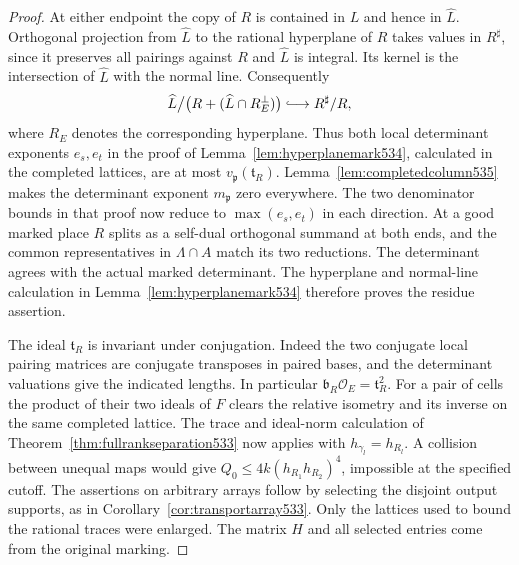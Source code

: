 \documentclass[a4paper,11pt]{article}
\theoremstyle{definition}
\theoremstyle{remark}
\numberwithin{equation}{section}
\begin{document}
\begin{proof}
At either endpoint the copy of \(R\) is contained in \(L\)
and hence in \(\widehat L\). Orthogonal projection from
\(\widehat L\) to the rational hyperplane of \(R\) takes
values in \(R^\sharp\), since it preserves all pairings against
\(R\) and \(\widehat L\) is integral. Its kernel is the
intersection of \(\widehat L\) with the normal line. Consequently
\[
    \widehat L\big/\big(R+(\widehat L\cap R_E^\perp)\big)
                    \lhook\joinrel\longrightarrow R^\sharp/R ,
\]
where \(R_E\) denotes the corresponding hyperplane. Thus both
local determinant exponents \(e_s,e_t\) in the proof of
Lemma~\ref{lem:hyperplanemark534}, calculated in the completed
lattices, are at most \(v_{\mathfrak p}(\mathfrak t_R)\).
Lemma~\ref{lem:completedcolumn535} makes the determinant
exponent \(m_{\mathfrak p}\) zero everywhere. The two denominator
bounds in that proof now reduce to \(\max(e_s,e_t)\) in each
direction. At a good marked place \(R\) splits as a self-dual
orthogonal summand at both ends, and the common representatives
in \(\Lambda\cap A\) match its two reductions. The determinant
agrees with the actual marked determinant. The hyperplane and
normal-line calculation in Lemma~\ref{lem:hyperplanemark534}
therefore proves the residue assertion.

The ideal \(\mathfrak t_R\) is invariant under conjugation.
Indeed the two conjugate local pairing matrices are conjugate
transposes in paired bases, and the determinant valuations give
the indicated lengths. In particular
\(\mathfrak b_R\mathcal O_E=\mathfrak t_R^2\). For a pair
of cells the product of their two ideals of \(F\) clears
the relative isometry and its inverse on the same completed
lattice. The trace and ideal-norm calculation of
Theorem~\ref{thm:fullrankseparation533} now applies with
\(h_{\gamma_l}=h_{R_l}\). A collision between unequal maps
would give \(Q_0\le4k(h_{R_1}h_{R_2})^4\), impossible at the
specified cutoff. The assertions on arbitrary arrays follow
by selecting the disjoint output supports, as in
Corollary~\ref{cor:transportarray533}. Only the lattices used
to bound the rational traces were enlarged. The matrix \(H\)
and all selected entries come from the original marking.
\end{proof}
\end{document}
